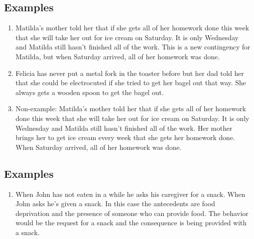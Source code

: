 \subsection{Examples}
\begin{enumerate}
\item Matilda's mother told her that if she gets all of her homework done this week that she will take her out for ice cream on Saturday. It is only Wednesday and Matilda still hasn't finished all of the work. This is a new contingency for Matilda, but when Saturday arrived, all of her homework was done.
\item Felicia has never put a metal fork in the toaster before but her dad told her that she could be electrocuted if she tried to get her bagel out that way. She always gets a wooden spoon to get the bagel out.
\item Non-example: Matilda's mother told her that if she gets all of her homework done this week that she will take her out for ice cream on Saturday. It is only Wednesday and Matilda still hasn't finished all of the work. Her mother brings her to get ice cream every week that she gets her homework done. When Saturday arrived, all of her homework was done.
%
\end{enumerate}
%
\subsection{Examples}
\begin{enumerate}
\item When John has not eaten in a while he asks his caregiver for a snack. When John asks he's given a snack. In this case the antecedents are food deprivation and the presence of someone who can provide food. The behavior would be the request for a snack and the consequence is being provided with a snack.
%
\end{enumerate}
%
